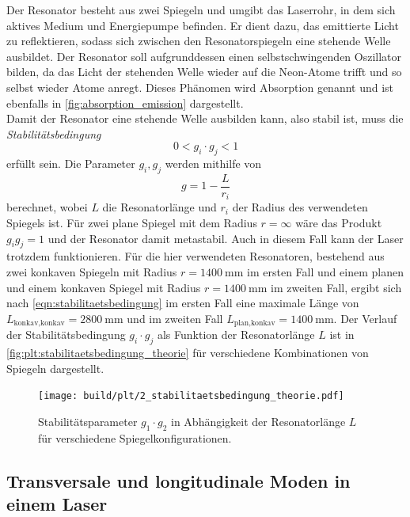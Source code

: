     Der Resonator besteht aus zwei Spiegeln und umgibt das Laserrohr,
    in dem sich aktives Medium und Energiepumpe befinden.
    Er dient dazu,
    das emittierte Licht zu reflektieren,
    sodass sich zwischen den Resonatorspiegeln eine stehende Welle ausbildet.
    Der Resonator soll aufgrunddessen einen selbstschwingenden Oszillator bilden,
    da das Licht der stehenden Welle wieder auf die Neon-Atome trifft und so selbst wieder Atome anregt.
    Dieses Phänomen wird Absorption genannt und ist ebenfalls in \autoref{fig:absorption_emission} dargestellt.\\
    Damit der Resonator eine stehende Welle ausbilden kann,
    also stabil ist,
    muss die \textit{Stabilitätsbedingung}
    \begin{equation}
        0 < g_i \cdot g_j < 1
        \label{eqn:stabilitaetsbedingung}
    \end{equation}
    erfüllt sein.
    Die Parameter $g_i, g_j$ werden mithilfe von
    \begin{equation}
        g = 1 - \frac{L}{r_i}
        \label{eqn:stabilitaetsparameter}
    \end{equation}
    berechnet,
    wobei $L$ die Resonatorlänge und $r_i$ der Radius des verwendeten Spiegels ist.
    Für zwei plane Spiegel mit dem Radius $r = \infty$ wäre das Produkt $g_ig_j = 1$ und der Resonator damit metastabil.
    Auch in diesem Fall kann der Laser trotzdem funktionieren.
    Für die hier verwendeten Resonatoren,
    bestehend aus zwei konkaven Spiegeln mit Radius $r = \SI{1400}{\milli\meter}$ im ersten Fall und einem planen und einem konkaven Spiegel mit Radius $r = \SI{1400}{\milli\meter}$ im zweiten Fall,
    ergibt sich nach \autoref{eqn:stabilitaetsbedingung} im ersten Fall eine maximale Länge von $L_\text{konkav,konkav} = \SI{2800}{\milli\meter}$ und im zweiten Fall $L_\text{plan,konkav} = \SI{1400}{\milli\meter}$.
    Der Verlauf der Stabilitätsbedingung $g_i \cdot g_j$ als Funktion der Resonatorlänge $L$ ist in \autoref{fig:plt:stabilitaetsbedingung_theorie} für verschiedene Kombinationen von Spiegeln dargestellt.
    \begin{figure}[H]
        \centering
        \texttt{[image: build/plt/2\_stabilitaetsbedingung\_theorie.pdf]}
        \caption{Stabilitätsparameter $g_1 \cdot g_2$ in Abhängigkeit der Resonatorlänge $L$ für verschiedene Spiegelkonfigurationen.}
        \label{fig:plt:stabilitaetsbedingung_theorie}
    \end{figure}


\subsection{Transversale und longitudinale Moden in einem Laser}
\label{sec:moden}

